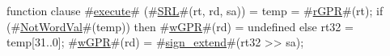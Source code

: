 function clause #\hyperref[zexecute]{execute}# (#\hyperref[zSRL]{SRL}#(rt, rd, sa)) =
  {
    temp = #\hyperref[zrGPR]{rGPR}#(rt);
    if (#\hyperref[zNotWordVal]{NotWordVal}#(temp)) then
      #\hyperref[zwGPR]{wGPR}#(rd) = undefined
    else {
      rt32 = temp[31..0];
      #\hyperref[zwGPR]{wGPR}#(rd) = #\hyperref[zsignzyextend]{sign\_extend}#(rt32 >> sa);
    }
  }
